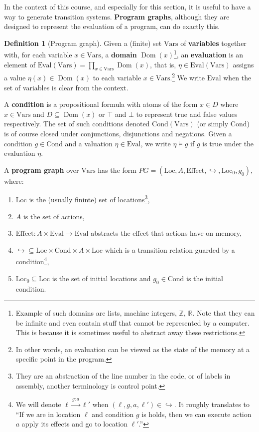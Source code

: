 \documentclass{tufte-handout} %
\theoremstyle{definition}
\newtheorem{defn}[thm]{Definition}
\theoremstyle{remark}
\newcommand{\R}{\mathbb{R}}
\newcommand{\Z}{\mathbb{Z}}
\newcommand{\0}{\textsf{0}}
\newcommand{\1}{\textsf{1}}
\newcommand{\Loc}{\text{Loc}}
\newcommand{\Eval}{\text{Eval}}
\newcommand{\Eff}{\text{Effect}}
\newcommand{\Vars}{\text{Vars}}
\newcommand{\Cond}{\text{Cond}}
\newcommand{\action}[1]{\stackrel{#1}{\rightarrow}}
\DeclareMathOperator{\Dom}{Dom}
\begin{document}
In the context of this course, and especially for this section, it is useful to have a way to generate transition systems. \textbf{Program graphs}, although they are designed to represent the evaluation of a program, can do exactly this.

\begin{defn}[Program graph]\label{defn-pg}
	Given a (finite) set $\Vars$ of \textbf{variables} together with, for each variable $x \in \Vars$, a \textbf{domain} $\Dom(x)$\footnote{Example of such domains are lists, machine integers, $\Z$, $\R$. Note that they can be infinite and even contain stuff that cannot be represented by a computer. This is because it is sometimes useful to abstract away these restrictions.}, an \textbf{evaluation} is an element of $\Eval(\Vars) = \prod_{x \in \Vars} \Dom(x)$, that is, $\eta \in \Eval(\Vars)$ assigns a value $\eta(x) \in \Dom(x)$ to each variable $x \in \Vars$.\footnote{In other words, an evaluation can be viewed as the state of the memory at a specific point in the program.} We write $\Eval$ when the set of variables is clear from the context.
	
	A \textbf{condition} is a propositional formula with atoms of the form $x \in D$ where $x \in \Vars$ and $D \subseteq \Dom(x)$ or $\top$ and $\bot$ to represent true and false values respectively. The set of such conditions denoted $\Cond(\Vars)$ (or simply $\Cond$) is of course closed under conjunctions, disjunctions and negations. Given a condition $g \in \Cond$ and a valuation $\eta \in \Eval$, we write $\eta \vDash g$ if $g$ is true under the evaluation $\eta$.
	
	A \textbf{program graph} over $\Vars$ has the form $PG = (\Loc, A, \Eff, \hookrightarrow, \Loc_0, g_0)$, where:
	\begin{enumerate}
		\item $\Loc$ is the (usually fininte) set of locations\footnote{They are an abstraction of the line number in the code, or of labels in assembly, another terminology is control point.},
		\item $A$ is the set of actions,
		\item $\Eff: A \times \Eval \rightarrow \Eval$ abstracts the effect that actions have on memory,
		\item $\hookrightarrow\subseteq \Loc \times \Cond  \times A \times \Loc$ which is a transition relation guarded by a condition\footnote{ We will denote $\ell \action{g:a} \ell'$ when $(\ell, g, a, \ell') \in \hookrightarrow$. It roughly translates to \textquotedblleft If we are in location $\ell$ and condition $g$ is holds, then we can execute action $a$ apply its effects and go to location $\ell'$.\textquotedblright},
		\item $\Loc_0 \subseteq \Loc$ is the set of initial locations and $g_0 \in \Cond$ is the initial condition.
	\end{enumerate}
\end{defn}
\end{document}
